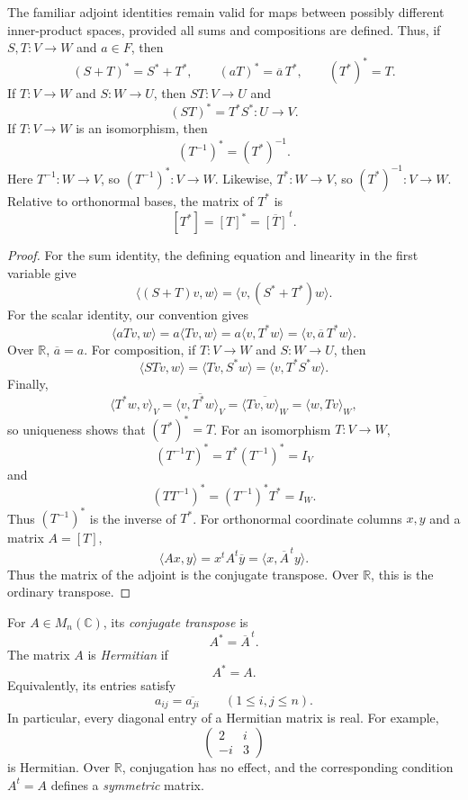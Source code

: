 \begin{proposition}
The familiar adjoint identities remain valid for maps between possibly
different inner-product spaces, provided all sums and compositions are
defined.  Thus, if \(S,T:V\to W\) and \(a\in F\), then
\[
(S+T)^*=S^*+T^*,
\qquad
(aT)^*=\overline a\,T^*,
\qquad
(T^*)^*=T.
\]
If \(T:V\to W\) and \(S:W\to U\), then \(ST:V\to U\) and
\[
(ST)^*=T^*S^*:U\to V.
\]
If \(T:V\to W\) is an isomorphism, then
\[
(T^{-1})^*=(T^*)^{-1}.
\]
Here \(T^{-1}:W\to V\), so \((T^{-1})^*:V\to W\).  Likewise,
\(T^*:W\to V\), so \((T^*)^{-1}:V\to W\).
Relative to orthonormal bases, the matrix of \(T^*\) is
\[
[T^*]=[T]^*=\overline{[T]}^{\,t}.
\]
\end{proposition}
\begin{proof}
For the sum identity, the defining equation and linearity in the first
variable give
\[
\langle(S+T)v,w\rangle
=\langle v,(S^*+T^*)w\rangle.
\]
For the scalar identity, our convention gives
\[
\langle aTv,w\rangle
=a\langle Tv,w\rangle
=a\langle v,T^*w\rangle
=\langle v,\overline a\,T^*w\rangle.
\]
Over \(\mathbb R\), \(\overline a=a\).  For composition, if
\(T:V\to W\) and \(S:W\to U\), then
\[
\langle STv,w\rangle
=\langle Tv,S^*w\rangle
=\langle v,T^*S^*w\rangle.
\]
Finally,
\[
\langle T^*w,v\rangle_V
=\overline{\langle v,T^*w\rangle_V}
=\overline{\langle Tv,w\rangle_W}
=\langle w,Tv\rangle_W,
\]
so uniqueness shows that \((T^*)^*=T\).  For an isomorphism \(T:V\to W\),
\[
(T^{-1}T)^*=T^*(T^{-1})^*=I_V
\]
and
\[
(TT^{-1})^*=(T^{-1})^*T^*=I_W.
\]
Thus \((T^{-1})^*\) is the inverse of \(T^*\).
For orthonormal coordinate columns \(x,y\) and a matrix \(A=[T]\),
\[
\langle Ax,y\rangle
=x^tA^t\overline y
=\langle x,\overline A^{\,t}y\rangle.
\]
Thus the matrix of the adjoint is the conjugate transpose. Over
\(\mathbb R\), this is the ordinary transpose.
\end{proof}

\begin{definition}
For \(A\in M_n(\mathbb C)\), its \emph{conjugate transpose} is
\[
A^*=\overline A^{\,t}.
\]
The matrix \(A\) is \emph{Hermitian} if
\[
A^*=A.
\]
Equivalently, its entries satisfy
\[
a_{ij}=\overline{a_{ji}}
\qquad(1\leq i,j\leq n).
\]
In particular, every diagonal entry of a Hermitian matrix is real.  For
example,
\[
\begin{pmatrix}2&i\\-i&3\end{pmatrix}
\]
is Hermitian.  Over \(\mathbb R\), conjugation has no effect, and the
corresponding condition \(A^t=A\) defines a \emph{symmetric}
matrix.
\end{definition}

